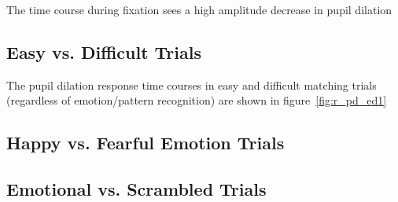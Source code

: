 	The time course during fixation sees a high amplitude decrease in pupil dilation
	
	\subsection{Easy vs. Difficult Trials}\label{sec:r_pd_ed}
	    The pupil dilation response time courses in easy and difficult matching trials (regardless of emotion/pattern recognition) are shown in figure~\ref{fig:r_pd_ed1}
	\subsection{Happy vs. Fearful Emotion Trials}\label{sec:r_pd_hf}
	\subsection{Emotional vs. Scrambled Trials}\label{sec:r_pd_es}
	    




